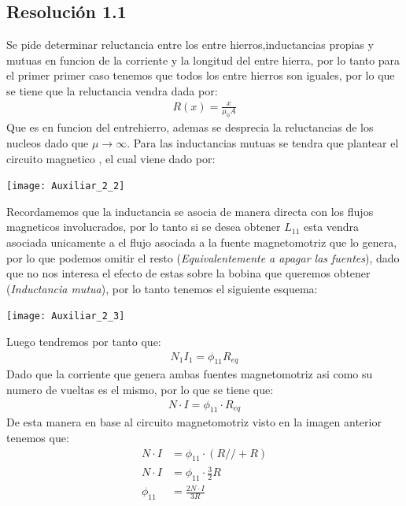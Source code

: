 \documentclass[
  11pt,
  letterpaper,
   addpoints,
   answers
  ]{exam}
\begin{document}
\begin{questions}
\begin{solution}
        \subsection*{Resolución 1.1}
        Se pide determinar reluctancia entre los entre hierros,inductancias propias y mutuas en funcion de la corriente y la longitud del entre hierra, por lo tanto para el primer primer caso tenemos que todos los entre hierros son iguales, por lo que se tiene que la reluctancia vendra dada por:
        \begin{align}
            R(x) = \frac{x}{\mu_{0}A}
        \end{align}
        Que es en funcion del entrehierro, ademas se desprecia la reluctancias de los nucleos dado que $\mu \rightarrow \infty$. Para las inductancias mutuas se tendra que plantear el circuito magnetico , el cual viene dado por:
        \begin{center}
            \texttt{[image: Auxiliar\_2\_2]}
        \end{center}
        Recordamemos que la inductancia se asocia de manera directa con los flujos magneticos involucrados, por lo tanto si se desea obtener $L_{11}$ esta vendra asociada unicamente a el flujo asociada a la fuente magnetomotriz que lo genera, por lo que podemos omitir el resto (\textit{Equivalentemente a apagar las fuentes}), dado que no nos interesa el efecto de estas sobre la bobina que queremos obtener (\textit{Inductancia mutua}), por lo tanto tenemos el siguiente esquema:
        \begin{center}
            \texttt{[image: Auxiliar\_2\_3]}
        \end{center}
        Luego tendremos por tanto que:
        \begin{align}
            N_{1}I_{1}= \phi_{11}R_{eq}
        \end{align}
        Dado que la corriente que genera ambas fuentes magnetomotriz asi como su numero de vueltas es el mismo, por lo que se tiene que:
        \begin{align}
            N \cdot I = \phi_{11} \cdot R_{eq}
        \end{align}
        De esta manera en base al circuito magnetomotriz visto en la imagen anterior tenemos que:
        \begin{align}
            N \cdot I &= \phi_{11} \cdot (R// + R)\\
            N \cdot I &= \phi_{11} \cdot \frac{3}{2}R\\
            \phi_{11} &= \frac{2N \cdot I}{3R}

\end{align}
\end{solution}
\end{questions}
\end{document}
